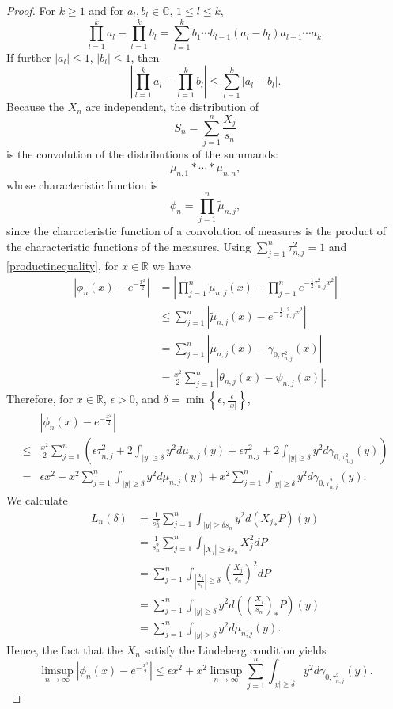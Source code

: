 \documentclass{article}
\theoremstyle{definition}
\theoremstyle{definition}
\begin{document}
\begin{proof}
For $k \geq 1$ and for $a_l,b_l \in \mathbb{C}$, $1 \leq l \leq k$,
\[
\prod_{l=1}^k a_l - \prod_{l=1}^k b_l= \sum_{l=1}^k b_1 \cdots b_{l-1} (a_l-b_l) a_{l+1} \cdots a_k.
\]
If further $|a_l| \leq 1$, $|b_l| \leq 1$, then
\begin{equation}
\left|\prod_{l=1}^k a_l - \prod_{l=1}^k b_l \right| \leq \sum_{l=1}^k |a_l-b_l|.
\label{productinequality}
\end{equation}
Because the $X_n$ are independent, the distribution of
\[
S_n = \sum_{j=1}^n \frac{X_j}{s_n}
\]
is the convolution of the distributions of the summands:
\[
\mu_{n,1} * \cdots * \mu_{n,n},
\]
whose characteristic function is
\[
\phi_n= \prod_{j=1}^n \tilde{\mu}_{n,j},
\]
since the characteristic function of a convolution of measures is the product of the characteristic functions
of the measures.
Using
$\sum_{j=1}^n \tau_{n,j}^2=1$ and \eqref{productinequality}, for $x \in \mathbb{R}$ we have
\begin{align*}
|\phi_n(x)-e^{-\frac{x^2}{2}}|&=\left| \prod_{j=1}^n \tilde{\mu}_{n,j}(x) - \prod_{j=1}^n e^{-\frac{1}{2} \tau_{n,j}^2 x^2}\right|\\
&\leq \sum_{j=1}^n \left|\tilde{\mu}_{n,j}(x) - e^{-\frac{1}{2} \tau_{n,j}^2 x^2}\right|\\
&=\sum_{j=1}^n \left|\tilde{\mu}_{n,j}(x) -  \tilde{\gamma}_{0,\tau_{n,j}^2}(x)\right|\\
&= \frac{x^2}{2} \sum_{j=1}^n \left|\theta_{n,j}(x)- \psi_{n,j}(x) \right|.
\end{align*} 
Therefore, for $x \in \mathbb{R}$, $\epsilon>0$, and 
$\delta = \min\left\{\epsilon,\frac{\epsilon}{|x|} \right\}$, 
\[
\begin{split}
&|\phi_n(x)-e^{-\frac{x^2}{2}}|\\
\leq&\frac{x^2}{2} \sum_{j=1}^n 
\left(\epsilon \tau_{n,j}^2 + 2 \int_{|y| \geq \delta} y^2 d\mu_{n,j}(y)
+\epsilon \tau_{n,j}^2+2\int_{|y| \geq \delta} y^2 d\gamma_{0,\tau_{n,j}^2}(y)\right)\\
=&\epsilon x^2 +x^2 \sum_{j=1}^n  \int_{|y| \geq \delta} y^2 d\mu_{n,j}(y)
+x^2 \sum_{j=1}^n \int_{|y| \geq \delta} y^2 d\gamma_{0,\tau_{n,j}^2}(y).
\end{split}
\]
We calculate
\begin{align*}
L_n(\delta)& = \frac{1}{s_n^2} \sum_{j=1}^n \int_{|y| \geq \delta s_n} y^2 d({X_j}_*P)(y)\\
&=\frac{1}{s_n^2} \sum_{j=1}^n \int_{|X_j| \geq \delta s_n} X_j^2 dP\\
&= \sum_{j=1}^n \int_{\left| \frac{X_j}{s_n}  \right|  \geq \delta} \left( \frac{X_j}{s_n} \right)^2 dP\\
&=\sum_{j=1}^n \int_{|y| \geq \delta} y^2 d\left(\left( \frac{X_j}{s_n} \right)_*P\right)(y)\\
&=\sum_{j=1}^n \int_{|y| \geq \delta} y^2 d\mu_{n,j}(y).
\end{align*}
Hence, the fact that the $X_n$ satisfy the Lindeberg condition yields
\begin{equation}
\limsup_{n \to \infty} |\phi_n(x)-e^{-\frac{x^2}{2}}| \leq \epsilon x^2 + x^2 \limsup_{n \to \infty}  \sum_{j=1}^n \int_{|y| \geq \delta} y^2 d\gamma_{0,\tau_{n,j}^2}(y).
\label{limsup1}
\end{equation}


\end{proof}
\end{document}
